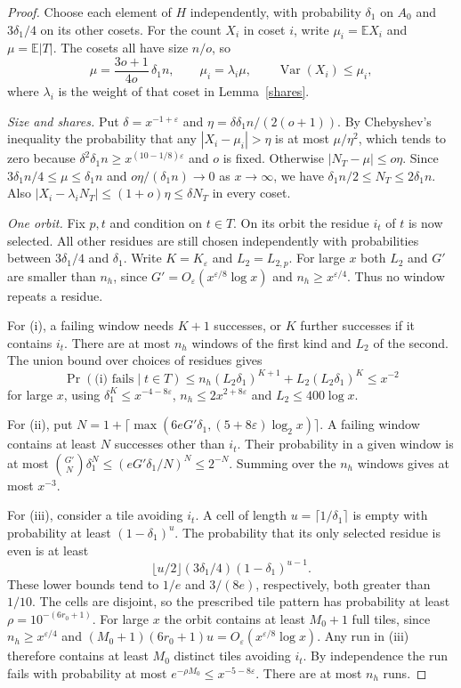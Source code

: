 \begin{proof}
Choose each element of $H$ independently, with probability $\delta_1$
on $A_0$ and $3\delta_1/4$ on its other cosets. For the count $X_i$ in
coset $i$, write $\mu_i=\mathbb E X_i$ and $\mu=\mathbb E|T|$.
The cosets all have size $n/o$, so
\[
 \mu=\frac{3o+1}{4o}\,\delta_1 n,\qquad
 \mu_i=\lambda_i\mu,\qquad \operatorname{Var}(X_i)\le\mu_i,
\]
where $\lambda_i$ is the weight of that coset in Lemma~\ref{shares}.

\emph{Size and shares.} Put $\delta=x^{-1+\varepsilon}$ and
$\eta=\delta\delta_1 n/(2(o+1))$. By Chebyshev's inequality the probability
that any $|X_i-\mu_i|>\eta$ is at most $\mu/\eta^2$, which tends to zero
because $\delta^2\delta_1 n\ge x^{(10-1/8)\varepsilon}$ and $o$ is fixed.
Otherwise $|N_T-\mu|\le o\eta$. Since
$3\delta_1 n/4\le\mu\le\delta_1 n$ and $o\eta/(\delta_1 n)\to0$ as
$x\to\infty$, we have $\delta_1 n/2\le N_T\le2\delta_1 n$. Also
$|X_i-\lambda_iN_T|\le(1+o)\eta\le\delta N_T$ in every coset.

\emph{One orbit.} Fix $p,t$ and condition on $t\in T$. On its orbit the
residue $i_t$ of $t$ is now selected. All other residues are still chosen
independently with probabilities between $3\delta_1/4$ and $\delta_1$.
Write $K=K_\varepsilon$ and $L_2=L_{2,p}$. For large $x$ both $L_2$
and $G'$ are smaller than $n_h$, since $G'=O_\varepsilon(x^{\varepsilon/8}\log x)$
and $n_h\ge x^{\varepsilon/4}$. Thus no window repeats a residue.

For (i), a failing window needs $K+1$ successes, or $K$ further successes
if it contains $i_t$. There are at most $n_h$ windows of the first kind
and $L_2$ of the second. The union bound over choices of residues gives
\[
 \Pr(\text{(i) fails}\mid t\in T)
 \le n_h(L_2\delta_1)^{K+1}+L_2(L_2\delta_1)^K\le x^{-2}
\]
for large $x$, using $\delta_1^K\le x^{-4-8\varepsilon}$,
$n_h\le2x^{2+8\varepsilon}$ and $L_2\le400\log x$.

For (ii), put $N=1+\lceil\max(6eG'\delta_1,(5+8\varepsilon)\log_2x)\rceil$.
A failing window contains at least $N$ successes other than $i_t$.
Their probability in a given window is at most
$\binom{G'}{N}\delta_1^N\le(eG'\delta_1/N)^N\le2^{-N}$.
Summing over the $n_h$ windows gives at most $x^{-3}$.

For (iii), consider a tile avoiding $i_t$. A cell of length
$u=\lceil1/\delta_1\rceil$ is empty with probability at least
$(1-\delta_1)^u$. The probability that its only selected residue is
even is at least
\[
 \lfloor u/2\rfloor(3\delta_1/4)(1-\delta_1)^{u-1}.
\]
These lower bounds tend to $1/e$ and $3/(8e)$, respectively, both
greater than $1/10$. The cells are disjoint, so the prescribed tile
pattern has probability at least $\rho=10^{-(6r_0+1)}$. For large $x$ the
orbit contains at least $M_0+1$ full tiles, since $n_h\ge x^{\varepsilon/4}$
and $(M_0+1)(6r_0+1)u=O_\varepsilon(x^{\varepsilon/8}\log x)$.
Any run in (iii) therefore contains at least $M_0$ distinct tiles
avoiding $i_t$. By independence the run fails with probability at most
$e^{-\rho M_0}\le x^{-5-8\varepsilon}$. There are at most $n_h$ runs.


\end{proof}
